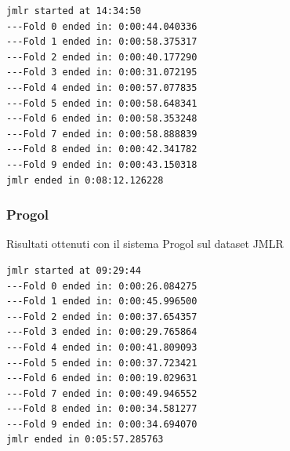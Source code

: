 \begin{verbatim}
jmlr started at 14:34:50
---Fold 0 ended in: 0:00:44.040336
---Fold 1 ended in: 0:00:58.375317
---Fold 2 ended in: 0:00:40.177290
---Fold 3 ended in: 0:00:31.072195
---Fold 4 ended in: 0:00:57.077835
---Fold 5 ended in: 0:00:58.648341
---Fold 6 ended in: 0:00:58.353248
---Fold 7 ended in: 0:00:58.888839
---Fold 8 ended in: 0:00:42.341782
---Fold 9 ended in: 0:00:43.150318
jmlr ended in 0:08:12.126228
\end{verbatim}


\subsubsection{Progol}
\begin{table}[H]
\caption[Risultati Progol-JMLR]{Risultati ottenuti con il sistema Progol sul dataset JMLR}
\label{tab:ris:progol:jmlr}
\end{table}

\begin{verbatim}
jmlr started at 09:29:44
---Fold 0 ended in: 0:00:26.084275
---Fold 1 ended in: 0:00:45.996500
---Fold 2 ended in: 0:00:37.654357
---Fold 3 ended in: 0:00:29.765864
---Fold 4 ended in: 0:00:41.809093
---Fold 5 ended in: 0:00:37.723421
---Fold 6 ended in: 0:00:19.029631
---Fold 7 ended in: 0:00:49.946552
---Fold 8 ended in: 0:00:34.581277
---Fold 9 ended in: 0:00:34.694070
jmlr ended in 0:05:57.285763
\end{verbatim}

